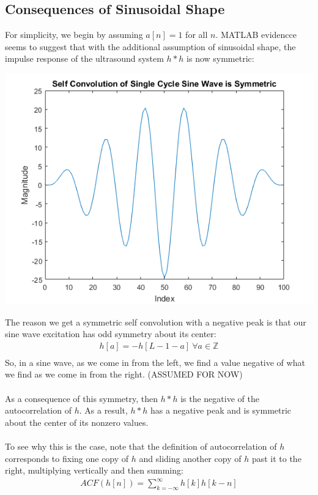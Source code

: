 \documentclass[a4paper]{article}
\begin{document}
\subsection*{Consequences of Sinusoidal Shape}
For simplicity, we begin by assuming $a[n] = 1$ for all $n$. MATLAB evidencce seems to suggest that with the additional assumption of sinusoidal shape, the impulse response of the ultrasound system $h*h$ is now symmetric:
\begin{center}
\includegraphics[scale=1]{symmConvSin.png}
\end{center}
The reason we get a symmetric self convolution with a negative peak  is that our sine wave excitation has odd symmetry about its center:
\begin{align*}
h[a] = -h[L-1 - a]~\forall a \in \mathbb{Z} \\
\end{align*}
So, in a sine wave, as we come in from the left, we find a value negative of what we find as we come in from the right.
(ASSUMED FOR NOW) \\\\
As a consequence of this symmetry, then $h*h$ is the negative of the autocorrelation of $h$. As a result, $h*h$ has a negative peak and is symmetric about the center of its nonzero values.
\\\\
To see why this is the case, note that the definition of autocorrelation of $h$ corresponds to fixing one copy of $h$ and sliding another copy of $h$ past it to the right, multiplying vertically and then summing:
\begin{align*}
ACF(h[n]) = \sum_{k=-\infty}^{\infty}h[k]h[k-n]
\end{align*}
\end{document}
